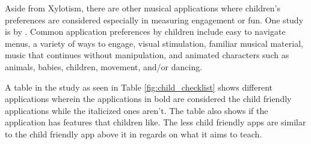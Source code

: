

Aside from Xylotism, there are other musical applications where children’s preferences are considered especially in measuring engagement or fun. One study is by . Common application preferences by children include easy to navigate menus, a variety of ways to engage, visual stimulation, familiar musical material, music that continues without manipulation, and animated characters such as animals, babies, children, movement, and/or dancing.

A table in the study as seen in Table \ref{fig:child_checklist} shows different applications wherein the applications in bold are considered the child friendly applications while the italicized ones aren’t. The table also shows if the application has features that children like. The less child friendly apps are similar to the child friendly app above it in regards on what it aims to teach. 


